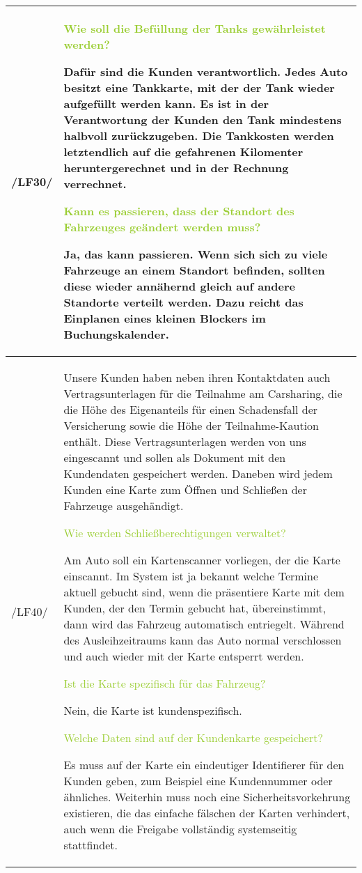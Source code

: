 \begin{tabular}{l | p{13cm}}
    \hline
    /LF30/ & \textcolor{YellowGreen}{Wie soll die Befüllung der Tanks gewährleistet werden?}

    \textcolor{NavyBlue}{Dafür sind die Kunden verantwortlich. Jedes Auto besitzt eine Tankkarte, mit der der Tank wieder aufgefüllt werden kann. Es ist in der Verantwortung der Kunden den Tank mindestens halbvoll zurückzugeben. Die Tankkosten werden letztendlich auf die gefahrenen Kilomenter heruntergerechnet und in der Rechnung verrechnet.}

    \textcolor{YellowGreen}{Kann es passieren, dass der Standort des Fahrzeuges geändert werden muss?}

    \textcolor{NavyBlue}{Ja, das kann passieren. Wenn sich sich zu viele Fahrzeuge an einem Standort befinden, sollten diese wieder annähernd gleich auf andere Standorte verteilt werden. Dazu reicht das Einplanen eines kleinen Blockers im Buchungskalender.}
    \\
    \hline
    /LF40/ & Unsere Kunden haben neben ihren Kontaktdaten auch Vertragsunterlagen für die Teilnahme am Carsharing, die die Höhe des Eigenanteils für einen Schadensfall der Versicherung sowie die Höhe der Teilnahme-Kaution enthält. Diese Vertragsunterlagen werden von uns eingescannt und sollen als Dokument mit den Kundendaten gespeichert werden. Daneben wird jedem Kunden eine Karte zum Öffnen und Schließen der Fahrzeuge ausgehändigt. 

    \textcolor{YellowGreen}{Wie werden Schließberechtigungen verwaltet?}

    \textcolor{NavyBlue}{Am Auto soll ein Kartenscanner vorliegen, der die Karte einscannt. Im System ist ja bekannt welche Termine aktuell gebucht sind, wenn die präsentiere Karte mit dem Kunden, der den Termin gebucht hat, übereinstimmt, dann wird das Fahrzeug automatisch entriegelt. Während des Ausleihzeitraums kann das Auto normal verschlossen und auch wieder mit der Karte entsperrt werden.}

    \textcolor{YellowGreen}{Ist die Karte spezifisch für das Fahrzeug?}

    \textcolor{NavyBlue}{Nein, die Karte ist kundenspezifisch.}

    \textcolor{YellowGreen}{Welche Daten sind auf der Kundenkarte gespeichert?}

    \textcolor{NavyBlue}{Es muss auf der Karte ein eindeutiger Identifierer für den Kunden geben, zum Beispiel eine Kundennummer oder ähnliches. Weiterhin muss noch eine Sicherheitsvorkehrung existieren, die das einfache fälschen der Karten verhindert, auch wenn die Freigabe vollständig systemseitig stattfindet.} \\

    \hline
\end{tabular}

